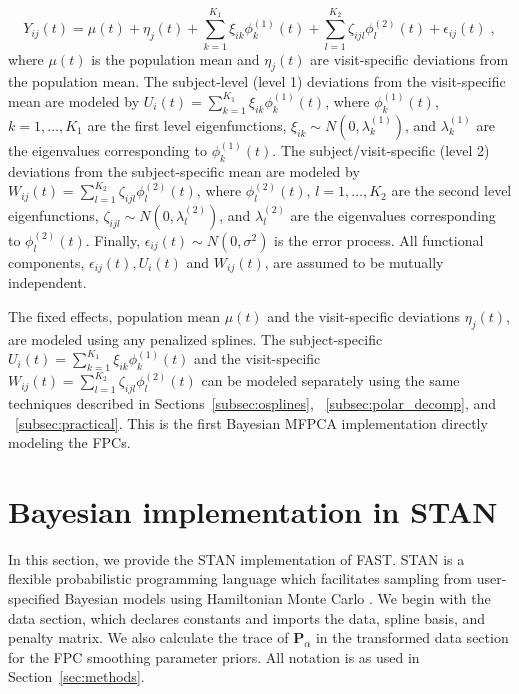 \documentclass[12pt]{article}
\begin{document}
\begin{equation}
    Y_{ij}(t) = \mu(t) + \eta_j(t) + \sum_{k = 1}^{K_1} \xi_{ik}\phi_k^{(1)}(t) + \sum_{l = 1}^{K_2}\zeta_{ijl}\phi_{l}^{(2)}(t) + \epsilon_{ij}(t)\;, \label{EQ:Multilevel}
\end{equation}
where $\mu(t)$ is the population mean and $\eta_j(t)$ are visit-specific deviations from the population mean. The subject-level (level 1) deviations from the visit-specific mean are modeled by $U_i(t)=\sum_{k = 1}^{K_1} \xi_{ik}\phi_k^{(1)}(t)$, where $\phi_k^{(1)}(t)$, $k = 1,\ldots, K_1$ are the first level eigenfunctions, $\xi_{ik} \sim N(0, \lambda^{(1)}_k)$, and $\lambda_k^{(1)}$ are the eigenvalues corresponding to $\phi_k^{(1)}(t)$. The subject/visit-specific (level 2) deviations from the subject-specific mean are modeled by $W_{ij}(t)=\sum_{l = 1}^{K_2}\zeta_{ijl}\phi_{l}^{(2)}(t)$, where $\phi_l^{(2)}(t)$, $l = 1,\ldots, K_2$ are the second level eigenfunctions, $\zeta_{ijl} \sim N(0, \lambda^{(2)}_l)$, and $\lambda^{(2)}_l$ are the eigenvalues corresponding to $\phi_l^{(2)}(t)$. Finally, $\epsilon_{ij}(t) \sim N(0, \sigma^2)$ is the error process. All functional components, $\epsilon_{ij}(t), U_i(t)$ and $W_{ij}(t)$, are assumed to be mutually independent.

The fixed effects, population mean $\mu(t)$ and the visit-specific deviations $\eta_j(t)$, are modeled using any penalized splines. The subject-specific $U_i(t)=\sum_{k = 1}^{K_1} \xi_{ik}\phi_k^{(1)}(t)$ and the visit-specific $W_{ij}(t)=\sum_{l = 1}^{K_2}\zeta_{ijl}\phi_{l}^{(2)}(t)$ can be modeled separately using the same techniques described in Sections~\ref{subsec:osplines}, ~\ref{subsec:polar_decomp}, and ~\ref{subsec:practical}. This is the first Bayesian MFPCA implementation directly modeling the FPCs.

\section{Bayesian implementation in STAN}\label{section:STAN}

In this section, we provide the {\ttfamily STAN} implementation of FAST. {\ttfamily STAN} is a flexible probabilistic programming language which facilitates sampling from user-specified Bayesian models using Hamiltonian Monte Carlo \citep{betancourt_conceptual_2018, carpenter_stan_2017}. We begin with the {\ttfamily data} section, which declares constants and imports the data, spline basis, and penalty matrix. We also calculate the trace of $\mathbf{P}_\alpha$ in the {\ttfamily transformed data} section for the FPC smoothing parameter priors. All notation is as used in Section~\ref{sec:methods}.
\end{document}
